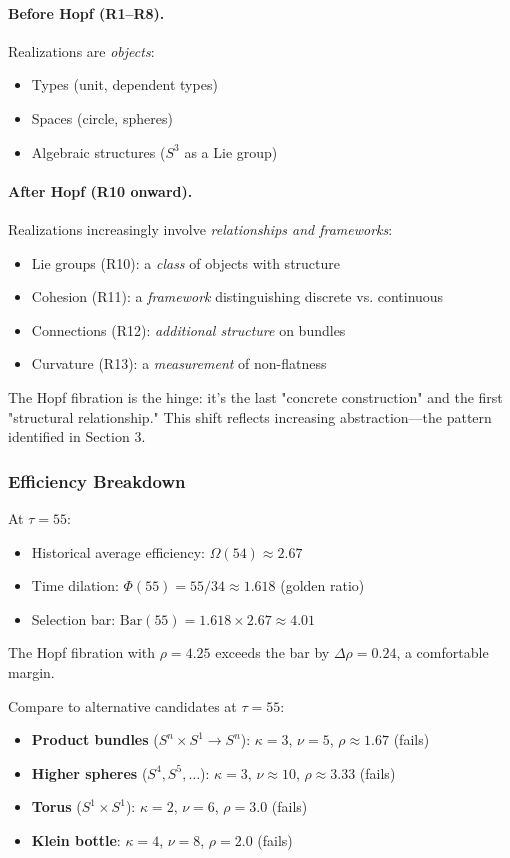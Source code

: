 \documentclass[11pt]{article}
\theoremstyle{definition}
\begin{document}
\paragraph{Before Hopf (R1--R8).}
Realizations are \emph{objects}:
\begin{itemize}
\item Types (unit, dependent types)
\item Spaces (circle, spheres)
\item Algebraic structures ($S^3$ as a Lie group)
\end{itemize}

\paragraph{After Hopf (R10 onward).}
Realizations increasingly involve \emph{relationships and frameworks}:
\begin{itemize}
\item Lie groups (R10): a \emph{class} of objects with structure
\item Cohesion (R11): a \emph{framework} distinguishing discrete vs. continuous
\item Connections (R12): \emph{additional structure} on bundles
\item Curvature (R13): a \emph{measurement} of non-flatness
\end{itemize}

The Hopf fibration is the hinge: it's the last "concrete construction" and the first "structural relationship." This shift reflects increasing abstraction—the pattern identified in Section 3.

\subsubsection{Efficiency Breakdown}

At $\tau=55$:
\begin{itemize}
\item Historical average efficiency: $\Omega(54) \approx 2.67$
\item Time dilation: $\Phi(55) = 55/34 \approx 1.618$ (golden ratio)
\item Selection bar: $\text{Bar}(55) = 1.618 \times 2.67 \approx 4.01$
\end{itemize}

The Hopf fibration with $\rho=4.25$ exceeds the bar by $\Delta\rho = 0.24$, a comfortable margin.

Compare to alternative candidates at $\tau=55$:
\begin{itemize}
\item \textbf{Product bundles} ($S^n \times S^1 \to S^n$): $\kappa=3$, $\nu=5$, $\rho \approx 1.67$ (fails)
\item \textbf{Higher spheres} ($S^4, S^5, \ldots$): $\kappa=3$, $\nu \approx 10$, $\rho \approx 3.33$ (fails)
\item \textbf{Torus} ($S^1 \times S^1$): $\kappa=2$, $\nu=6$, $\rho=3.0$ (fails)
\item \textbf{Klein bottle}: $\kappa=4$, $\nu=8$, $\rho=2.0$ (fails)
\end{itemize}
\end{document}
